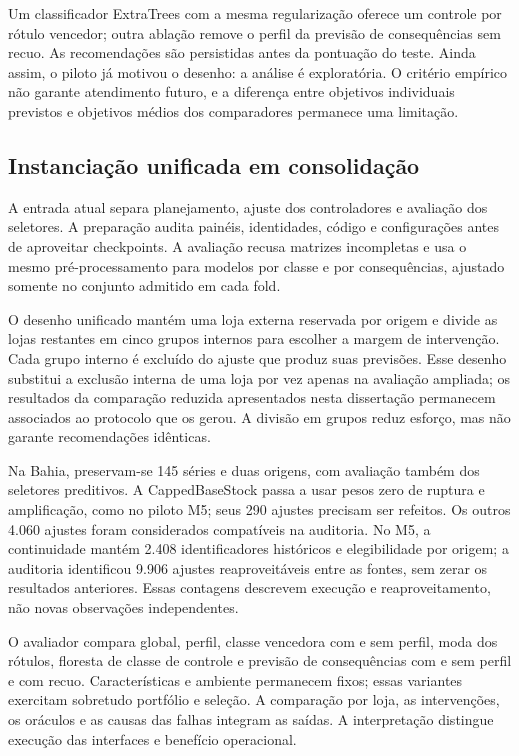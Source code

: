 Um classificador ExtraTrees com a mesma regularização oferece um controle por rótulo vencedor; outra ablação remove o perfil da previsão de consequências sem recuo. As recomendações são persistidas antes da pontuação do teste. Ainda assim, o piloto já motivou o desenho: a análise é exploratória. O critério empírico não garante atendimento futuro, e a diferença entre objetivos individuais previstos e objetivos médios dos comparadores permanece uma limitação.

\subsection{Instanciação unificada em consolidação}
A entrada atual separa planejamento, ajuste dos controladores e avaliação dos seletores. A preparação audita painéis, identidades, código e configurações antes de aproveitar checkpoints. A avaliação recusa matrizes incompletas e usa o mesmo pré-processamento para modelos por classe e por consequências, ajustado somente no conjunto admitido em cada fold.

O desenho unificado mantém uma loja externa reservada por origem e divide as lojas restantes em cinco grupos internos para escolher a margem de intervenção. Cada grupo interno é excluído do ajuste que produz suas previsões. Esse desenho substitui a exclusão interna de uma loja por vez apenas na avaliação ampliada; os resultados da comparação reduzida apresentados nesta dissertação permanecem associados ao protocolo que os gerou. A divisão em grupos reduz esforço, mas não garante recomendações idênticas.

Na Bahia, preservam-se 145 séries e duas origens, com avaliação também dos seletores preditivos. A CappedBaseStock passa a usar pesos zero de ruptura e amplificação, como no piloto M5; seus 290 ajustes precisam ser refeitos. Os outros 4.060 ajustes foram considerados compatíveis na auditoria. No M5, a continuidade mantém 2.408 identificadores históricos e elegibilidade por origem; a auditoria identificou 9.906 ajustes reaproveitáveis entre as fontes, sem zerar os resultados anteriores. Essas contagens descrevem execução e reaproveitamento, não novas observações independentes.

O avaliador compara global, perfil, classe vencedora com e sem perfil, moda dos rótulos, floresta de classe de controle e previsão de consequências com e sem perfil e com recuo. Características e ambiente permanecem fixos; essas variantes exercitam sobretudo portfólio e seleção. A comparação por loja, as intervenções, os oráculos e as causas das falhas integram as saídas. A interpretação distingue execução das interfaces e benefício operacional.

